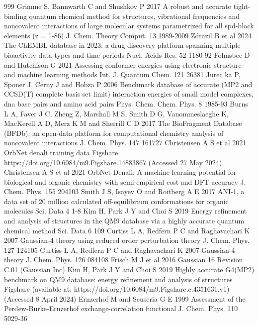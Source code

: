 \documentclass[12pt]{article}
\begin{document}
\begin{thebibliography}{999}
 Grimme S, Bannwarth C and Shushkov P 2017 A robust and accurate tight-binding quantum chemical method for structures, vibrational frequencies and noncovalent interactions of large molecular systems parametrized for all spd-block elements (z = 1-86) J. Chem. Theory Comput. 13 1989-2009
 Zdrazil B et al 2024 The ChEMBL database in 2023: a drug discovery platform spanning multiple bioactivity data types and time periods Nucl. Acids Res. 52 1180-92
 Folmsbee D and Hutchison G 2021 Assessing conformer energies using electronic structure and machine learning methods Int. J. Quantum Chem. 121 26381
 Jurec ka P, Sponer J, Cerny J and Hobza P 2006 Benchmark database of accurate (MP2 and CCSD(T) complete basis set limit) interaction energies of small model complexes, dna base pairs and amino acid pairs Phys. Chem. Chem. Phys. 8 1985-93
 Burns L A, Faver J C, Zheng Z, Marshall M S, Smith D G, Vanommeslaeghe K, MacKerell A D, Merz K M and Sherrill C D 2017 The BioFragment Database (BFDb): an open-data platform for computational chemistry analysis of noncovalent interactions J. Chem. Phys. 147 161727
 Christensen A S et al 2021 OrbNet denali training data Figshare https://doi.org/10.6084/m9.Figshare.14883867 (Accessed 27 May 2024)
 Christensen A S et al 2021 OrbNet Denali: A machine learning potential for biological and organic chemistry with semi-empirical cost and DFT accuracy J. Chem. Phys. 155 204103
 Smith J S, Isayev O and Roitberg A E 2017 ANI-1, a data set of 20 million calculated off-equilibrium conformations for organic molecules Sci. Data 4 1-8
 Kim H, Park J Y and Choi S 2019 Energy refinement and analysis of structures in the QM9 database via a highly accurate quantum chemical method Sci. Data 6 109
 Curtiss L A, Redfern P C and Raghavachari K 2007 Gaussian-4 theory using reduced order perturbation theory J. Chem. Phys. 127 124105
 Curtiss L A, Redfern P C and Raghavachari K 2007 Gaussian-4 theory J. Chem. Phys. 126 084108
 Frisch M J et al 2016 Gaussian 16 Revision C.01 (Gaussian Inc)
 Kim H, Park J Y and Choi S 2019 Highly accurate G4(MP2) benchmark on QM9 database: energy refinement and analysis of structures Figshare (available at: https://doi.org/10.6084/m9.Figshare.c.4351631.v1) (Accessed 8 April 2024)
 Ernzerhof M and Scuseria G E 1999 Assessment of the Perdew-Burke-Ernzerhof exchange-correlation functional J. Chem. Phys. 110 5029-36

\end{thebibliography}
\end{document}
